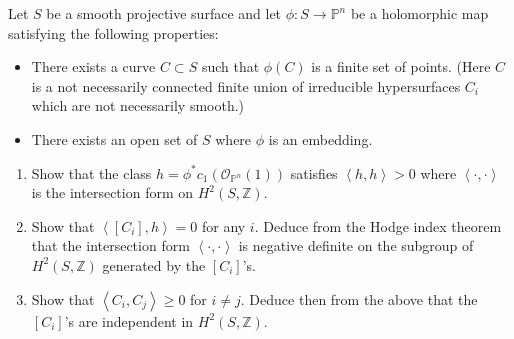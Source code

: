 \begin{exercise}
\label{exercise-curve-surfa-hodge-index}
\begin{reference}
\cite[Exercise 2, Chapter 11]{voi}
\end{reference}
Let $S$ be a smooth projective surface and
let $\phi:S \to \mathbb{P}^n$
be a holomorphic map satisfying the following
properties:
\begin{itemize}
\item There exists a curve $C \subset S$
such that $\phi(C)$ is a finite set of
points.
(Here $C$ is a not necessarily connected
finite union
of irreducible hypersurfaces $C_i$ which are
not necessarily smooth.)

\item There exists an open set of $S$ where
$\phi$ is an embedding.
\end{itemize}
\begin{enumerate}
\item Show that the class
$h=\phi^*c_1(\mathcal{O}_{\mathbb{P}^n}(1))$
satisfies $\left\langle{}h,h\right\rangle{} >0$ where
$\left\langle{}\cdot,\cdot\right\rangle{}$ is the
intersection form on $H^2(S,\mathbb{Z})$.

\item Show that $\left\langle{}[C_i],h\right\rangle{}=0$ for
any $i$.
Deduce from the Hodge index theorem that the
intersection form
$\left\langle{}\cdot,\cdot\right\rangle{}$ is negative
definite on the subgroup
of $H^2(S,\mathbb{Z})$ generated by the
$[C_i]$'s.

\item Show that $\left\langle{}C_i,C_j\right\rangle{}\geq 0$
for $i\neq j$.
Deduce then from the above that the $[C_i]$'s
are independent in $H^2(S,\mathbb{Z})$.
\end{enumerate}
\end{exercise}

